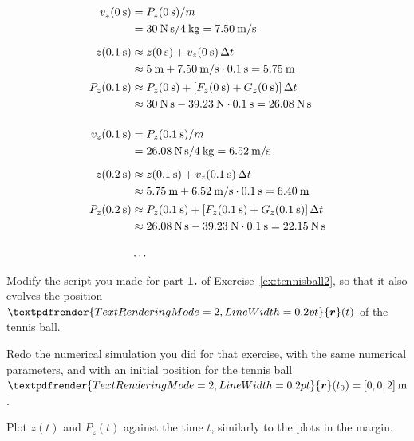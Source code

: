 \documentclass[a4paper,12pt,%
onecolumn,oneside,%
british%
]{memoir}
\renewcommand*{\bm}[1]{\textpdfrender{TextRenderingMode=2,LineWidth=0.2pt}{\boldsymbol{#1}}}
\newcommand*{\incr}{\Delta}%
\renewcommand*{\|}[1][]{\nonscript\:#1\vert\nonscript\:\mathopen{}}
\newcommand*{\yr}{\bm{r}}
\newcommand*{\yti}{t_{0}}
\newcommand*{\Dt}{\incr t}
\newcommand*{\yM}{m}%
\begin{document}
\begin{equation*}
  \begin{aligned}
    v_{z}(\qty{0}{s}) &= P_{z}(\qty{0}{s})/\yM\\
    &=\qty{30}{N\,s}/\qty{4}{kg} = \qty{7.50}{m/s}
    \\[2\jot]
    z(\qty{0.1}{s})  &\approx z(\qty{0}{s}) + v_{z}(\qty{0}{s})\,\Dt\\
    &\approx \qty{5}{m} + \qty{7.50}{m/s}\cdot\qty{0.1}{s} = \qty{5.75}{m}
    \\[0.5\jot]
    P_{z}(\qty{0.1}{s})  &\approx P_{z}(\qty{0}{s}) + [F_{z}(\qty{0}{s}) + G_{z}(\qty{0}{s})]\,\Dt \\
    &\approx\qty{30}{N\,s} -\qty{39.23}{N}\cdot\qty{0.1}{s} = \qty{26.08}{N\,s}
    \\[4\jot]
    v_{z}(\qty{0.1}{s}) &= P_{z}(\qty{0.1}{s})/\yM\\
    &=\qty{26.08}{N\,s}/\qty{4}{kg} = \qty{6.52}{m/s}
    \\[2\jot]
    z(\qty{0.2}{s})  &\approx z(\qty{0.1}{s}) + v_{z}(\qty{0.1}{s})\,\Dt\\
    &\approx \qty{5.75}{m} + \qty{6.52}{m/s}\cdot\qty{0.1}{s} = \qty{6.40}{m}
    \\[0.5\jot]
    P_{z}(\qty{0.2}{s})  &\approx P_{z}(\qty{0.1}{s}) + [F_{z}(\qty{0.1}{s}) + G_{z}(\qty{0.1}{s})]\,\Dt\\
    &\approx\qty{26.08}{N\,s} -\qty{39.23}{N}\cdot\qty{0.1}{s} = \qty{22.15}{N\,s}
    \\[3\jot]
    &\dotso
  \end{aligned}
\end{equation*}

\begin{exercise}[label={ex:tennisball3}]
  Modify the script you made for part \textbf{1.} of Exercise~\ref{ex:tennisball2}, so that it also evolves the position $\yr(t)$ of the tennis ball.

  Redo the numerical simulation you did for that exercise, with the same numerical parameters, and with an initial position for the tennis ball $\yr(\yti) = [0,0,2]\:\unit{m}$.

  Plot $z(t)$ and $P_{z}(t)$ against the time $t$, similarly to the plots in the margin.
\end{exercise}
\end{document}
